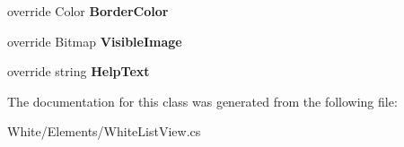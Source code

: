 \begin{DoxyCompactItemize}
\item 
\hypertarget{class_proto_test_1_1_golem_1_1_white_1_1_elements_1_1_white_list_view_ace2cd6bdbc6b037747ce3586a1a0ab41}{override Color {\bfseries Border\-Color}}\label{class_proto_test_1_1_golem_1_1_white_1_1_elements_1_1_white_list_view_ace2cd6bdbc6b037747ce3586a1a0ab41}

\item 
\hypertarget{class_proto_test_1_1_golem_1_1_white_1_1_elements_1_1_white_list_view_a8c2e264e370406b12d200273050abc31}{override Bitmap {\bfseries Visible\-Image}}\label{class_proto_test_1_1_golem_1_1_white_1_1_elements_1_1_white_list_view_a8c2e264e370406b12d200273050abc31}

\item 
\hypertarget{class_proto_test_1_1_golem_1_1_white_1_1_elements_1_1_white_list_view_a091ab2d8683d9ab35511911df4011207}{override string {\bfseries Help\-Text}}\label{class_proto_test_1_1_golem_1_1_white_1_1_elements_1_1_white_list_view_a091ab2d8683d9ab35511911df4011207}

\end{DoxyCompactItemize}


The documentation for this class was generated from the following file\-:\begin{DoxyCompactItemize}
\item 
White/\-Elements/White\-List\-View.\-cs\end{DoxyCompactItemize}
